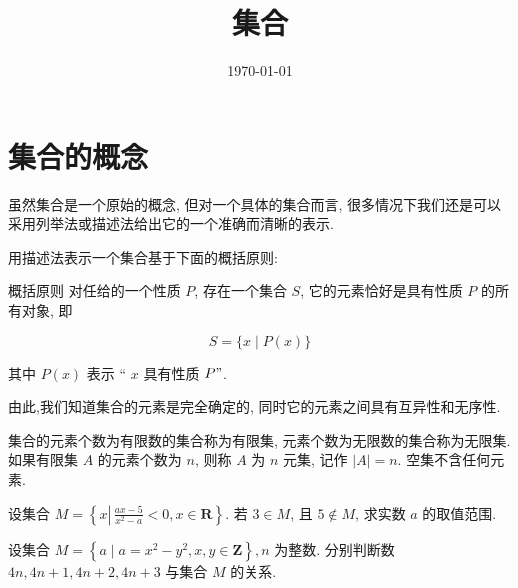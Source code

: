 \documentclass[aspectratio=169]{ctexbeamer}
\title[集合]{集合}
\subtitle{}
\author[珠海市第一中学]{\kaishu{珠海市第一中学}}
\date[\today]{\today}
\begin{document}
\frame{\titlepage}
{}

\section{集合的概念}
\begin{frame}
虽然集合是一个原始的概念, 但对一个具体的集合而言, 很多情况下我们还是可以采用列举法或描述法给出它的一个准确而清晰的表示.

用描述法表示一个集合基于下面的概括原则:

概括原则 对任给的一个性质 $P$, 存在一个集合 $S$, 它的元素恰好是具有性质 $P$ 的所有对象, 即

$$
	S=\{x \mid P(x)\}
$$

其中 $P(x)$ 表示 “ $x$ 具有性质 $P "$.

由此,我们知道集合的元素是完全确定的, 同时它的元素之间具有互异性和无序性.

集合的元素个数为有限数的集合称为有限集, 元素个数为无限数的集合称为无限集. 如果有限集 $A$ 的元素个数为 $n$, 则称 $A$ 为 $n$ 元集, 记作 $|A|=n$. 空集不含任何元素.
\end{frame}

\begin{frame}
	设集合 $M=\left\{x \left\lvert\, \frac{a x-5}{x^{2}-a}<0\right., x \in \mathbf{R}\right\}$. 若 $3 \in M$, 且 $5 \notin M$, 求实数 $a$ 的取值范围.


\end{frame}

\begin{frame}
	设集合 $M=\left\{a \mid a=x^{2}-y^{2}, x, y \in \mathbf{Z}\right\}, n$ 为整数. 分别判断数 $4 n ,  4 n+1 ,  4 n+2 ,  4 n+3$ 与集合 $M$ 的关系.
\end{frame}
\end{document}
